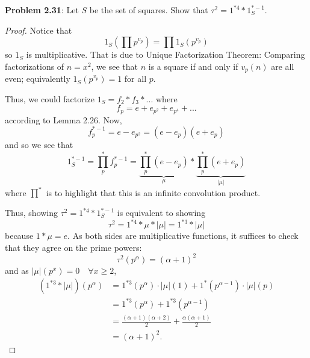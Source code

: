 \documentclass{article}
\begin{document}
\textbf{Problem 2.31}: Let $S$ be the set of squares. Show that $\tau^2 = 1^{*4} * 1_S^{*-1}$.

\begin{proof}
Notice that
$$1_S\left(\prod p^{v_p}\right) = \prod 1_S(p^{v_p})$$
so $1_S$ is multiplicative. That is due to Unique Factorization Theorem: Comparing factorizations of $n = x^2$, we see that $n$ is a square if and only if $v_p(n)$ are all even; equivalently $1_S(p^{v_p}) = 1$ for all $p$.

Thus, we could factorize $1_S = f_2 * f_3 * ...$ where
$$f_p = e + e_{p^2} + e_{p^4} + ...$$
according to Lemma 2.26. Now,
$$f_p^{*-1} = e - e_{p^2} = (e - e_p)(e + e_p)$$
and so we see that
$$1_S^{*-1} = \prod_p^* f_p^{*-1} = \underbrace{\prod_p^* (e - e_p)}_{\mu} * \underbrace{\prod_p^{*} (e + e_p)}_{|\mu|}$$
where $\prod^*$ is to highlight that this is an infinite convolution product.

Thus, showing $\tau^2 = 1^{*4} * 1_S^{*-1}$ is equivalent to showing
$$\tau^2 = 1^{*4} * \mu * |\mu| = 1^{*3} * |\mu|$$
because $1 * \mu = e$. As both sides are multiplicative functions, it suffices to check that they agree on the prime powers:
$$\tau^2(p^\alpha) = (\alpha + 1)^2$$
and as $|\mu|(p^x) = 0 \quad \forall x \geq 2$,
\begin{align*}
(1^{*3} * |\mu|)(p^\alpha) &= 1^{*3}(p^\alpha) \cdot |\mu|(1) + 1^*(p^{\alpha-1}) \cdot |\mu|(p) \\
&= 1^{*3}(p^\alpha) + 1^{*3}(p^{\alpha-1})\\
&= \frac{(\alpha + 1)(\alpha + 2)}{2} + \frac{\alpha(\alpha + 1)}{2}\\
&= (\alpha + 1)^2.
\end{align*}
\end{proof}
\end{document}
